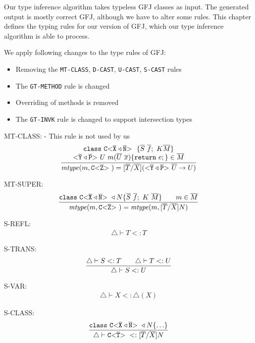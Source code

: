 Our type inference algorithm takes typeless GFJ classes as input.
The generated output is mostly correct GFJ, although we have to alter some rules.
This chapter defines the typing rules for our version of GFJ,
which our type inference algorithm is able to process.

We apply following changes to the type rules of GFJ:
\begin{itemize}
\item Removing the \texttt{MT-CLASS}, \texttt{D-CAST}, \texttt{U-CAST}, \texttt{S-CAST} rules
\item The \texttt{GT-METHOD} rule is changed
\item Overriding of methods is removed
\item The \texttt{GT-INVK} rule is changed to support intersection types
\end{itemize}

MT-CLASS: - This rule is not used by us
\begin{align*}
\ddfrac{\begin{array}{c}
\texttt{class} \ \exptype{C}{\ol{X} \triangleleft \ol{N}} \ \{ \ol{S} \ \ol{f}; \ K \ol{M} \}\\
\exptype{}{\ol{Y} \triangleleft \ol{P}} U \ m(\ol{U} \ \ol{x})\{  \texttt{return} \ e; \} \in \ol{M}
\end{array}}
{\mathit{mtype}(m, \exptype{C}{\ol{Z}}) = [\ol{T}/\ol{X}](\exptype{}{\ol{Y} \triangleleft \ol{P}} \ol{U} \to U)}
\end{align*}

MT-SUPER:
\begin{align*}
\frac{\displaystyle \texttt{class}\ \mathtt{C {\tt <} \overline{X} \triangleleft \overline{N} {\tt >} \ } \triangleleft N \{ \overline{S}\ \overline{f};\ K \ \overline{M} \}
\quad \quad m \in \overline{M}}{\displaystyle \mathit{mtype}(m, \mathtt{C {\tt <} \overline{Z} {\tt >} \ }) = \mathit{mtype}(m, [\overline{T}/\overline{X}]N)}
\end{align*}

S-REFL:
\begin{align*}
\triangle \vdash T <: T
\end{align*}

S-TRANS:
\begin{align*}
\frac{\displaystyle 
    \triangle \vdash S <: T \quad \quad \triangle \vdash T <: U
}{\displaystyle 
    \triangle \vdash S <: U
}
\end{align*}

S-VAR:
\begin{align*}
\triangle \vdash X <: \triangle(X)
\end{align*}

S-CLASS:
\begin{align*}
\frac{\displaystyle 
  \texttt{class}\ \mathtt{C {\tt <} \overline{X} \triangleleft \overline{N} {\tt >} \ } \triangleleft N \{  \ldots  \}
}{\displaystyle 
  \triangle \vdash \mathtt{C {\tt <} \overline{T} {\tt >} \ } <: [\overline{T}/\overline{X}]N
}
\end{align*}

